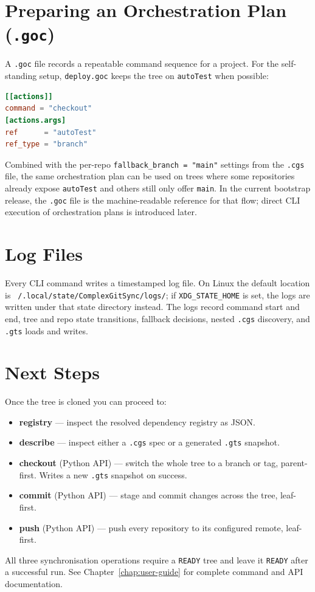 \documentclass[11pt,a4paper]{article}
\begin{document}
\section{Preparing an Orchestration Plan (\texttt{.goc})}

A \texttt{.goc} file records a repeatable command sequence for a project.
For the self-standing setup, \texttt{deploy.goc} keeps the tree on
\texttt{autoTest} when possible:

\begin{lstlisting}[language=toml]
[[actions]]
command = "checkout"
[actions.args]
ref      = "autoTest"
ref_type = "branch"
\end{lstlisting}

Combined with the per-repo \texttt{fallback\_branch = "main"} settings from
the \texttt{.cgs} file, the same orchestration plan can be used on trees where
some repositories already expose \texttt{autoTest} and others still only offer
\texttt{main}. In the current bootstrap release, the \texttt{.goc} file is the
machine-readable reference for that flow; direct CLI execution of orchestration
plans is introduced later.

\section{Log Files}

Every CLI command writes a timestamped log file. On Linux the default location
is \texttt{~/.local/state/ComplexGitSync/logs/}; if
\texttt{XDG\_STATE\_HOME} is set, the logs are written under that state
directory instead. The logs record command start and end, tree and repo state
transitions, fallback decisions, nested \texttt{.cgs} discovery, and
\texttt{.gts} loads and writes.

\section{Next Steps}

Once the tree is cloned you can proceed to:
\begin{itemize}
  \item \textbf{registry} — inspect the resolved dependency registry as JSON.
  \item \textbf{describe} — inspect either a \texttt{.cgs} spec or a generated \texttt{.gts} snapshot.
  \item \textbf{checkout} (Python API) — switch the whole tree to a branch or tag,
    parent-first.  Writes a new \texttt{.gts} snapshot on success.
  \item \textbf{commit} (Python API) — stage and commit changes across the tree,
    leaf-first.
  \item \textbf{push} (Python API) — push every repository to its configured
    remote, leaf-first.
\end{itemize}

All three synchronisation operations require a \texttt{READY} tree and leave it
\texttt{READY} after a successful run.  See Chapter~\ref{chap:user-guide} for
complete command and API documentation.
\end{document}
